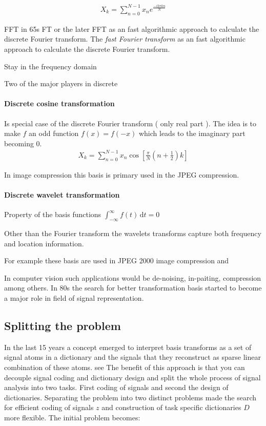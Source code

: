 \begin{align*}
 X_k = \sum_{n=0}^{N-1}x_ne^{\frac{-i2\pi kn}{N}}
\end{align*}

FFT in 65s
FT or the later FFT as an fast algorithmic approach to calculate the discrete
Fourier transform.
The \emph{fast Fourier transform}  as an fast algorithmic approach to calculate
the discrete Fourier transform.



Stay in the frequency domain

Two of the major players in discrete 

\paragraph{Discrete cosine transformation}
Is special case of the discrete Fourier transform ( only real part ).
The idea is to make $f$ an odd function $f(x) = f(-x) $ which leads to the
imaginary part becoming 0.
\begin{align*}
X_k = \sum_{n=0}^{N-1}x_n\cos \left[ \frac{\pi}{N} \left(
n+\frac{1}{2}\right) k\right]
\end{align*}
\Todo{}

In image compression this basis is primary used in the JPEG compression.


\paragraph{Discrete wavelet transformation}

Property of the basis functions
$\int_{-\infty}^{\infty} \! f(t) \, \mathrm{d}t = 0$

\Todo{}
Other than the Fourier transform the wavelets transforms capture both frequency
and location information.

For example these basis are used in JPEG 2000 image compression and 

In computer vision such applications would be de-noising, in-paiting,
compression among others. In 80s the search for better transformation basis
started to become a major role in field of signal representation.\cite{}


\subsection{Splitting the problem}
\cite{Rubinstein2010}
In the last 15 years a concept emerged to interpret basis transforms as a set of
signal atoms in a dictionary and the signals that they reconstruct as sparse
linear combination of these atoms. see\cite{Olshausen1996,Mallat1993} The
benefit of this approach is that you can decouple signal coding and dictionary
design and split the whole process of signal analysis into two tasks. First
coding of signals and second the design of dictionaries. Separating the problem
into two distinct problems made the search for efficient coding of signals $z$
and construction of task specific dictionaries $D$ more flexible\cite{?}. The
initial problem becomes:


